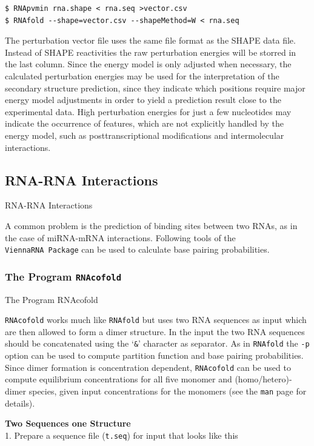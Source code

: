 \documentclass[]{article}
\begin{document}
\begin{verbatim}
$ RNApvmin rna.shape < rna.seq >vector.csv
$ RNAfold --shape=vector.csv --shapeMethod=W < rna.seq
\end{verbatim}

The perturbation vector file uses the same file format as the SHAPE data
file. Instead of SHAPE reactivities the raw perturbation energies will be
storred in the last column. Since the energy model is only adjusted when
necessary, the calculated perturbation energies may be used for the
interpretation of the secondary structure prediction, since they
indicate which positions require major energy model adjustments in order
to yield a prediction result close to the experimental data. High
perturbation energies for just a few nucleotides may indicate the
occurrence of features, which are not explicitly handled by the energy
model, such as posttranscriptional modifications and intermolecular
interactions.

\subsection{RNA-RNA Interactions}{RNA-RNA Interactions}\label{rna-rna-interactions}

A common problem is the prediction of binding sites between two RNAs, as
in the case of miRNA-mRNA interactions. Following tools of the
\texttt{ViennaRNA\ Package} can be used to calculate base pairing
probabilities.

\subsubsection{The Program \texttt{RNAcofold}}{The Program RNAcofold}\label{the-program-rnacofold}

\texttt{RNAcofold} works much like \texttt{RNAfold} but uses two RNA
sequences as input which are then allowed to form a dimer structure. In
the input the two RNA sequences should be concatenated using the
`\texttt{\&}' character as separator. As in \texttt{RNAfold} the
\texttt{-p} option can be used to compute partition function and base
pairing probabilities.\\
Since dimer formation is concentration dependent, \texttt{RNAcofold} can
be used to compute equilibrium concentrations for all five monomer and
(homo/hetero)-dimer species, given input concentrations for the monomers
(see the \texttt{man} page for details).

\textbf{Two Sequences one Structure}\\
1. Prepare a sequence file (\texttt{t.seq}) for input that looks like
this
\end{document}

